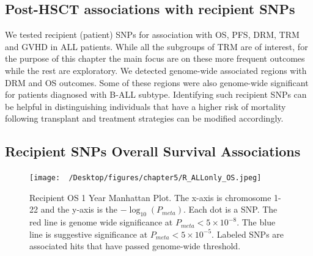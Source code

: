 \documentclass[]{DissertateOSU}
\begin{document}
\subsection{Post-HSCT associations with recipient
SNPs}\label{post-hsct-associations-with-recipient-snps}

We tested recipient (patient) SNPs for association with OS, PFS, DRM,
TRM and GVHD in ALL patients. While all the subgroups of TRM are of
interest, for the purpose of this chapter the main focus are on these
more frequent outcomes while the rest are exploratory. We detected
genome-wide associated regions with DRM and OS outcomes. Some of these
regions were also genome-wide significant for patients diagnosed with
B-ALL subtype. Identifying such recipient SNPs can be helpful in
distinguishing individuals that have a higher risk of mortality
following transplant and treatment strategies can be modified
accordingly.

\subsection{Recipient SNPs Overall Survival
Associations}\label{recipient-snps-overall-survival-associations}

\begin{figure}
    \centering
    \texttt{[image: ~/Desktop/figures/chapter5/R\_ALLonly\_OS.jpeg]}
    \caption[Recipient OS 1 Year Manhattan Plot]{Recipient OS 1 Year Manhattan Plot. The x-axis is chromosome 1-22 and the y-axis is the $-\log_{10}(P_{meta})$. Each dot is a SNP. The red line is genome wide significance at $P_{meta} < 5\times{10}^{-8}$. The blue line is suggestive significance at $P_{meta} < 5\times{10}^{-5}$. Labeled SNPs are associated hits that have passed genome-wide threshold.}
    \label{fig:r_os_1y}
\end{figure}

\end{document}
